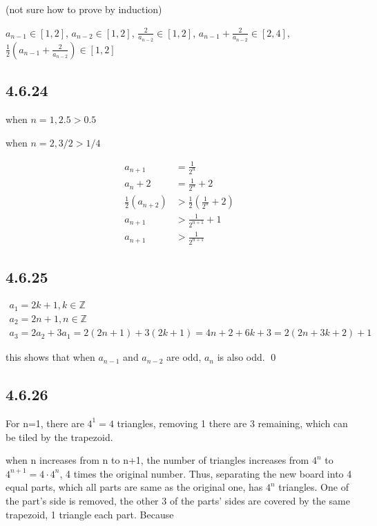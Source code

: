 \documentclass{article}
\begin{document}
(not sure how to prove by induction)

$a_{n-1} \in [1,2]$, $a_{n-2} \in [1,2]$, $\frac{2}{a_{n-2}} \in [1,2]$, $a_{n-1}+\frac{2}{a_{n-2}} \in [2,4]$, $\frac{1}{2}(a_{n-1}+\frac{2}{a_{n-2}}) \in [1,2]$

\subsection*{4.6.24}

when $n=1, 2.5 > 0.5$ \checkmark

when $n=2, 3/2 > 1/4$ \checkmark

$$\begin{aligned}a_{n+1}&=\frac1{2^n}\\a_n+2&=\frac1{2^n}+2\\\frac12\left(a_{n+2}\right)&>\frac12\left(\frac1{2^n}+2\right)\\a_{n+1}&>\frac1{2^{n+1}}+1\\a_{n+1}&>\frac1{2^{n+1}}\end{aligned}$$

\subsection*{4.6.25}

\begin{gather*}
    a_1=2k+1, k\in\mathbb{Z}\\
    a_2=2n+1, n\in\mathbb{Z}\\
    a_3=2a_2+3a_1=2(2n+1)+3(2k+1)=4n+2+6k+3=2(2n+3k+2)+1
\end{gather*}

this shows that when $a_{n-1}$ and $a_{n-2}$ are odd, $a_n$ is also odd. \qed

\subsection*{4.6.26}

For n=1, there are $4^1=4$ triangles, removing 1 there are 3 remaining, which can be tiled by the trapezoid.

when n increases from n to n+1, the number of triangles increases from $4^n$ to $4^{n+1}=4\cdot 4^n$, 4 times the original number. Thus, separating the new board into 4 equal parts, which all parts are same as the original one, has $4^n$ triangles. One of the part's side is removed, the other 3 of the parts' sides are covered by the same trapezoid, 1 triangle each part. Because
\end{document}
